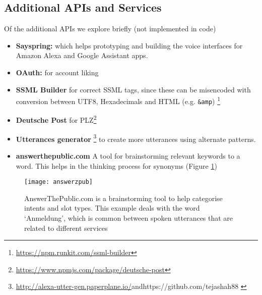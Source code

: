 \subsection*{Additional APIs and Services}
Of the additional APIs we explore briefly (not implemented in code) %
\begin{itemize}
	\itemsep0em
	\item \textbf{Sayspring:} which helps prototyping and building the voice interfaces for Amazon Alexa and Google Assistant apps.
	\item \textbf{OAuth:} for account liking 
\item \textbf{SSML Builder} for correct SSML tags, since these can be misencoded with conversion between UTF8, Hexadecimals and HTML (e.g. \texttt{&amp}) \footnote{\url{https://npm.runkit.com/ssml-builder}}
\item \textbf{Deutsche Post} for PLZ\footnote{\url{https://www.npmjs.com/package/deutsche-post}}
\item \textbf{Utterances generator} \footnote{\url{http://alexa-utter-gen.paperplane.io/}and{https://github.com/tejashah88
}} to create more utterances using alternate patterns.


\item \textbf{answerthepublic.com} A tool for brainstorming relevant keywords to a word. This helps in the thinking process for synonyms (Figure \ref{answerzpb})
\end{itemize}





\begin{figure}[H]
	\caption[Brainstorming Tool Example]{AnswerThePublic.com is a brainstorming tool to help categorise intents and slot types. This example deals with the word `Anmeldung', which is common between spoken utterances that are related to different services}
	\label{answerzpb}
	\texttt{[image: answerzpub]}
\end{figure}


